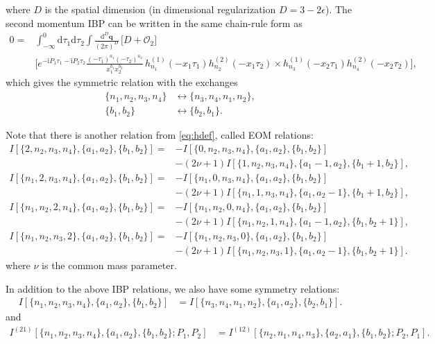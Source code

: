 \documentclass[a4paper]{article}
\newcommand{\FR}[2]{\displaystyle\frac{\,{#1}\,}{#2}}
\def\di{{\mathrm{d}}}
\def\ii{\mathrm{i}}
\def\ep{\epsilon}
\begin{document}
where $D$ is the spatial dimension (in dimensional regularization $D=3-2\ep$). The second momentum IBP can be written in the same chain-rule form as
\begin{align}
	0 ={}& \int_{-\infty}^0 \di\tau_1\di\tau_2\int \FR{\di^D \bm q}{(2\pi)^D}\,
	\Big[D+\mathcal{O}_2\Big]\nonumber\\
	&\Bigg[
	e^{-\ii P_1\tau_1-\ii P_2\tau_2}
	\frac{(-\tau_1)^{a_1}(-\tau_2)^{a_2}}{x_1^{b_1}x_2^{b_2}}\,
	h_{n_1}^{(1)}(-x_1\tau_1)h_{n_2}^{(2)}(-x_1\tau_2) \times h_{n_3}^{(1)}(-x_2\tau_1)h_{n_4}^{(2)}(-x_2\tau_2)\Bigg], \label{eq:momIBP_qk_chainrule}
\end{align}
which gives the symmetric relation with the exchanges
\begin{align}
	\{n_1,n_2,n_3,n_4\} &\leftrightarrow \{n_3,n_4,n_1,n_2\}, \nonumber\\
	\{b_1,b_2\} &\leftrightarrow \{b_2,b_1\}. \nonumber
\end{align}

Note that there is another relation from \eqref{eq:hdef}, called EOM relations:
\begin{align}
	I[\{2,n_2,n_3,n_4\},\{a_1,a_2\},\{b_1,b_2\}] = & - I[\{0,n_2,n_3,n_4\},\{a_1,a_2\},\{b_1,b_2\}]\nonumber      \\
   & - (2\nu+1) I[\{1,n_2,n_3,n_4\},\{a_1-1,a_2\},\{b_1+1,b_2\}], \label{eq:eom1} \\
	I[\{n_1,2,n_3,n_4\},\{a_1,a_2\},\{b_1,b_2\}] = & - I[\{n_1,0,n_3,n_4\},\{a_1,a_2\},\{b_1,b_2\}]\nonumber      \\
& - (2\nu+1) I[\{n_1,1,n_3,n_4\},\{a_1,a_2-1\},\{b_1+1,b_2\}], \label{eq:eom2} \\
	I[\{n_1,n_2,2,n_4\},\{a_1,a_2\},\{b_1,b_2\}] = & - I[\{n_1,n_2,0,n_4\},\{a_1,a_2\},\{b_1,b_2\}]\nonumber      \\
     & - (2\nu+1) I[\{n_1,n_2,1,n_4\},\{a_1-1,a_2\},\{b_1,b_2+1\}], \label{eq:eom3} \\
	I[\{n_1,n_2,n_3,2\},\{a_1,a_2\},\{b_1,b_2\}] = & - I[\{n_1,n_2,n_3,0\},\{a_1,a_2\},\{b_1,b_2\}]\nonumber      \\
     & - (2\nu+1) I[\{n_1,n_2,n_3,1\},\{a_1,a_2-1\},\{b_1,b_2+1\}]. \label{eq:eom_relations}
\end{align}
where $\nu$ is the common mass parameter.

In addition to the above IBP relations, we also have some symmetry relations:
\begin{align}
	I[\{n_1,n_2,n_3,n_4\},\{a_1,a_2\},\{b_1,b_2\}] &= I[\{n_3,n_4,n_1,n_2\},\{a_1,a_2\},\{b_2,b_1\}]. \label{eq:sym1}
\end{align}
and
\begin{align}
	I^{(21)}[\{n_1,n_2,n_3,n_4\},\{a_1,a_2\},\{b_1,b_2\}; P_1,P_2] &= I^{(12)}[\{n_2,n_1,n_4,n_3\},\{a_2,a_1\},\{b_1,b_2\}; P_2,P_1]. \label{eq:sym2}
\end{align}
\end{document}
